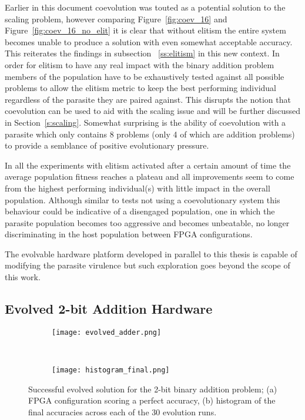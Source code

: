 Earlier in this document coevolution was touted as a potential solution to the scaling
problem, however comparing Figure~\ref{fig:coev_16} and Figure~\ref{fig:coev_16_no_elit}
it is clear that without elitism the entire system becomes unable to produce a solution
with even somewhat acceptable accuracy. This reiterates the findings in subsection
~\ref{ss:elitism} in this new context. In order for elitism to have any real impact
with the binary addition problem members of the population have to be exhaustively tested
against all possible problems to allow the elitism metric to keep the best performing
individual regardless of the parasite they are paired against. This disrupts the
notion that coevolution can be used to aid with the scaling issue and will be further
discussed in Section~\ref{s:scaling}. Somewhat surprising is the ability of coevolution
with a parasite which only contains 8 problems (only 4 of which are addition problems)
to provide a semblance of positive evolutionary pressure.

In all the experiments with elitism activated after
a certain amount of time the average population
fitness reaches a plateau and all improvements seem to come from the highest performing
individual(s) with little impact in the overall population. Although similar to
tests not using a coevolutionary system this behaviour could be indicative
of a disengaged population, one in which the parasite population becomes too aggressive
and becomes unbeatable, no longer discriminating in the host population between FPGA
configurations.

The evolvable hardware platform developed in parallel to this thesis is capable of
modifying the parasite virulence but such exploration goes beyond the scope of this
work.

\subsection{Evolved 2-bit Addition Hardware}

\begin{figure}
	\centering
	\begin{subfigure}[ht]{0.45\textwidth}
		\texttt{[image: evolved\_adder.png]}
		\caption{}
		\vspace{1em}
		\label{fig:2-bit}
	\end{subfigure}
	~
	\begin{subfigure}[ht]{0.45\textwidth}
		\texttt{[image: histogram\_final.png]}
		\caption{}
		\vspace{1em}
		\label{fig:final_hist}
	\end{subfigure}
	\caption[Successful evolved solution for the 2-bit binary addition problem]{Successful
		evolved solution for the 2-bit binary addition problem;
	(a) FPGA configuration scoring a perfect accuracy, (b) histogram of the final accuracies
	across each of the 30 evolution runs.}
\end{figure}

